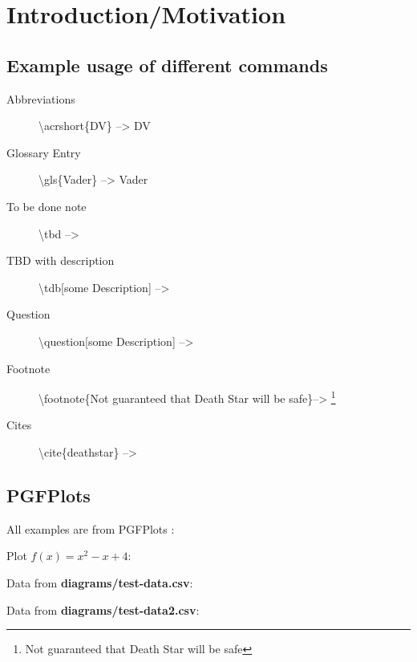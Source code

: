 \chapter{Introduction/Motivation}
\section{Example usage of different commands}


 \begin{description}
	\item[Abbreviations] \textbackslash acrshort\{DV\} -->  \acrshort{DV}
	\item[Glossary Entry] \textbackslash gls\{Vader\} -->  \gls{Vader}
	\item[To be done note] \textbackslash tbd --> \tbd
	\item[TBD with description] \textbackslash tdb[some Description] --> 
	\item[Question] \textbackslash question[some Description] --> 
	\item[Footnote] \textbackslash footnote\{Not guaranteed that Death Star will be safe\}--> \footnote{Not guaranteed that Death Star will be safe}
	\item[Cites] \textbackslash cite\{deathstar\} --> \cite{deathstar}
 \end{description}


\section{PGFPlots}

All examples are from PGFPlots \cite{pgfplots:sourceforge}:

Plot \textbf{$f(x) = x^2 - x +4$}:



Data from \textbf{diagrams/test-data.csv}:

\loadedtable
{}

Data from \textbf{diagrams/test-data2.csv}:

\loadTestData
{}
